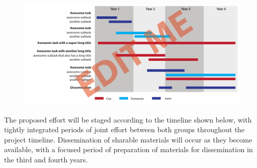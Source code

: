 
\begin{figure}[t]
\centering
\includegraphics [width=0.97\linewidth]{figures/timeline.pdf}
\label{fig:timeline}
\end{figure}

The proposed effort will be staged according to the timeline shown below, with
tightly integrated periods of joint effort between both groups throughout the project timeline.
Dissemination of sharable materials will occur as they become available, with a focused period
of preparation of materials for dissemination in the third and fourth years.
